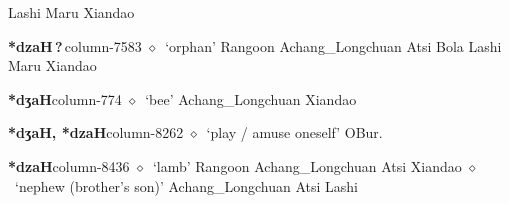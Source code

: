          Lashi 
\hspace{1ex}
         Maru 
\hspace{1ex}
         Xiandao 
  \item {\footnotesize \textbf{*dzaH\,?\,}}{\tiny column-7583}
         $\diamond$~`orphan'
         Rangoon 
\hspace{1ex}
         Achang\_Longchuan 
\hspace{1ex}
         Atsi 
\hspace{1ex}
         Bola 
\hspace{1ex}
         Lashi 
\hspace{1ex}
         Maru 
\hspace{1ex}
         Xiandao 
  \item {\footnotesize \textbf{*dʒaH}}{\tiny column-774}
         $\diamond$~`bee'
         Achang\_Longchuan 
\hspace{1ex}
         Xiandao 
  \item {\footnotesize \textbf{*dʒaH, *dzaH}}{\tiny column-8262}
         $\diamond$~`play / amuse oneself'
         OBur. 
  \item {\footnotesize \textbf{*dzaH}}{\tiny column-8436}
         $\diamond$~`lamb'
         Rangoon 
\hspace{1ex}
         Achang\_Longchuan 
\hspace{1ex}
         Atsi 
\hspace{1ex}
         Xiandao 
\hspace{1ex}
         $\diamond$~`nephew (brother's son)'
         Achang\_Longchuan 
\hspace{1ex}
         Atsi 
\hspace{1ex}
         Lashi 
